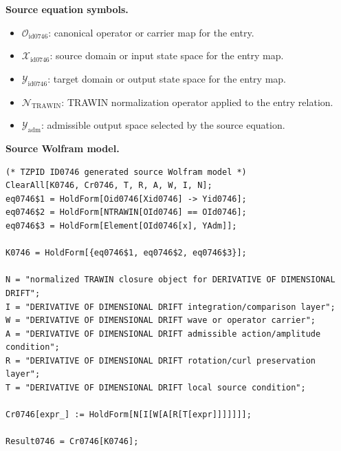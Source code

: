 \begin{minipage}[t]{0.49\linewidth}
\begingroup
\small
\raggedright
\textbf{Source equation symbols.}\par
\begin{itemize}[leftmargin=1.35em,itemsep=1pt,topsep=1pt,parsep=0pt]
    \item $\mathcal{O}_{\mathrm{id0746}}$: canonical operator or carrier map for the entry.
    \item $\mathcal{X}_{\mathrm{id0746}}$: source domain or input state space for the entry map.
    \item $\mathcal{Y}_{\mathrm{id0746}}$: target domain or output state space for the entry map.
    \item $\mathcal{N}_{\mathrm{TRAWIN}}$: TRAWIN normalization operator applied to the entry relation.
    \item $\mathcal{Y}_{\mathrm{adm}}$: admissible output space selected by the source equation.
\end{itemize}
\endgroup
\end{minipage}\hfill
\begin{minipage}[t]{0.47\linewidth}
\begingroup
\scriptsize
\raggedright
\textbf{Source Wolfram model.}\par
\begin{Verbatim}[fontsize=\tiny,breaklines=true,breakanywhere=true]
(* TZPID ID0746 generated source Wolfram model *)
ClearAll[K0746, Cr0746, T, R, A, W, I, N];
eq0746$1 = HoldForm[Oid0746[Xid0746] -> Yid0746];
eq0746$2 = HoldForm[NTRAWIN[OId0746] == OId0746];
eq0746$3 = HoldForm[Element[OId0746[x], YAdm]];

K0746 = HoldForm[{eq0746$1, eq0746$2, eq0746$3}];

N = "normalized TRAWIN closure object for DERIVATIVE OF DIMENSIONAL DRIFT";
I = "DERIVATIVE OF DIMENSIONAL DRIFT integration/comparison layer";
W = "DERIVATIVE OF DIMENSIONAL DRIFT wave or operator carrier";
A = "DERIVATIVE OF DIMENSIONAL DRIFT admissible action/amplitude condition";
R = "DERIVATIVE OF DIMENSIONAL DRIFT rotation/curl preservation layer";
T = "DERIVATIVE OF DIMENSIONAL DRIFT local source condition";

Cr0746[expr_] := HoldForm[N[I[W[A[R[T[expr]]]]]]];

Result0746 = Cr0746[K0746];
\end{Verbatim}
\endgroup
\end{minipage}

